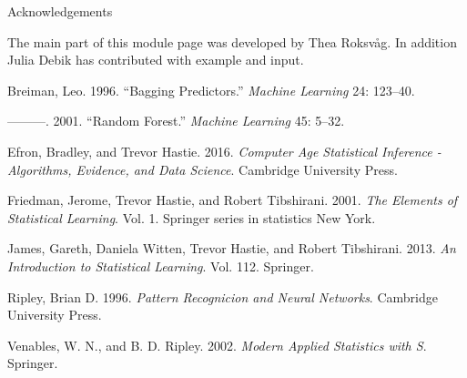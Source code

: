 \documentclass[ignorenonframetext,]{beamer}
\begin{document}
\begin{frame}{Acknowledgements}

The main part of this module page was developed by Thea Roksvåg. In
addition Julia Debik has contributed with example and input.

\hypertarget{refs}{}
\hypertarget{ref-Bagging}{}
Breiman, Leo. 1996. ``Bagging Predictors.'' \emph{Machine Learning} 24:
123--40.

\hypertarget{ref-RandomForest}{}
---------. 2001. ``Random Forest.'' \emph{Machine Learning} 45: 5--32.

\hypertarget{ref-casi}{}
Efron, Bradley, and Trevor Hastie. 2016. \emph{Computer Age Statistical
Inference - Algorithms, Evidence, and Data Science}. Cambridge
University Press.

\hypertarget{ref-ESL}{}
Friedman, Jerome, Trevor Hastie, and Robert Tibshirani. 2001. \emph{The
Elements of Statistical Learning}. Vol. 1. Springer series in statistics
New York.

\hypertarget{ref-ISL}{}
James, Gareth, Daniela Witten, Trevor Hastie, and Robert Tibshirani.
2013. \emph{An Introduction to Statistical Learning}. Vol. 112.
Springer.

\hypertarget{ref-Ripley}{}
Ripley, Brian D. 1996. \emph{Pattern Recognicion and Neural Networks}.
Cambridge University Press.

\hypertarget{ref-MASS}{}
Venables, W. N., and B. D. Ripley. 2002. \emph{Modern Applied Statistics
with S}. Springer.

\end{frame}
\end{document}

